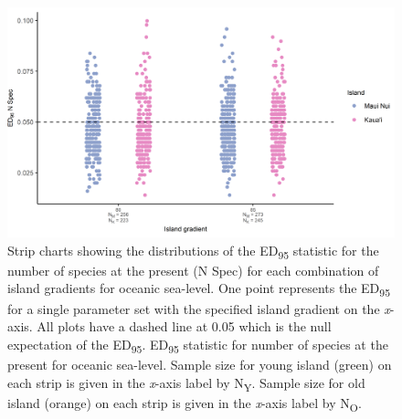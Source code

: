 \begin{figure}
    \centering
    \includegraphics{Island_gradient_sea_level_num_spec.png}
    \caption{Strip charts showing the distributions of the ED\textsubscript{95} statistic for the number of species at the present (N Spec) for each combination of island gradients for oceanic sea-level. One point represents the ED\textsubscript{95} for a single parameter set with the specified island gradient on the \textit{x}-axis. All plots have a dashed line at 0.05 which is the null expectation of the ED\textsubscript{95}. ED\textsubscript{95} statistic for number of species at the present for oceanic sea-level. Sample size for young island (green) on each strip is given in the \textit{x}-axis label by N\textsubscript{Y}. Sample size for old island (orange) on each strip is given in the \textit{x}-axis label by N\textsubscript{O}.}
    \label{fig:Island_gradient_sea_level_num_spec}
\end{figure}

